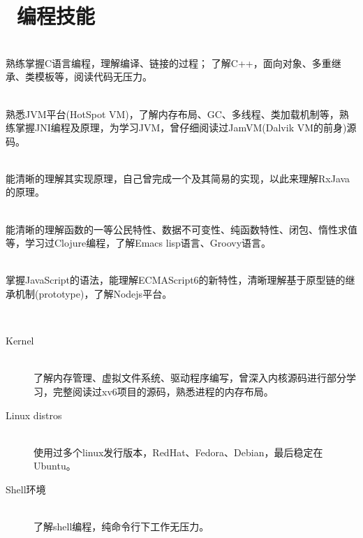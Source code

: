 \documentclass{resume}
\begin{document}
\newpage

\section{\faCogs\ 编程技能}
\begin{description}[parsep=0.5ex]
  \item[C和C++] \ \\ 熟练掌握C语言编程，理解编译、链接的过程； 了解C++，面向对象、多重继承、类模板等，阅读代码无压力。
  \item[JVM平台] \ \\ 熟悉JVM平台(HotSpot VM)，了解内存布局、GC、多线程、类加载机制等，熟练掌握JNI编程及原理，为学习JVM，曾仔细阅读过JamVM(Dalvik VM的前身)源码。
  \item[RxJava] \ \\ 能清晰的理解其实现原理，自己曾完成一个及其简易的实现，以此来理解RxJava的原理。
  \item[函数式编程] \ \\ 能清晰的理解函数的一等公民特性、数据不可变性、纯函数特性、闭包、惰性求值等，学习过Clojure编程，了解Emacs lisp语言、Groovy语言。
  \item[JavaScript] \ \\ 掌握JavaScript的语法，能理解ECMAScript6的新特性，清晰理解基于原型链的继承机制(prototype)，了解Nodejs平台。
  \item[Linux平台] \ 
    \begin{description}
      \item[Kernel] \ \\ 了解内存管理、虚拟文件系统、驱动程序编写，曾深入内核源码进行部分学习，完整阅读过xv6项目的源码，熟悉进程的内存布局。
      \item[Linux distros] \ \\ 使用过多个linux发行版本，RedHat、Fedora、Debian，最后稳定在Ubuntu。
      \item[Shell环境] \ \\ 了解shell编程，纯命令行下工作无压力。
    \end{description}
\end{description}
\end{document}
